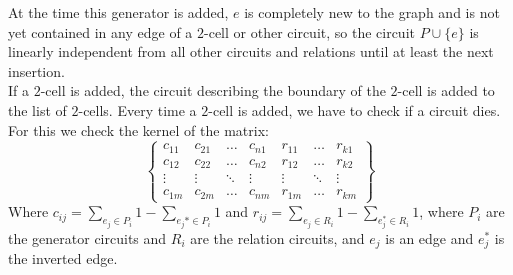 \documentclass[11pt, a4paper, UKenglish]{article}
\begin{document}
    At the time this generator is added, $e$ is completely new to the graph and is not yet contained in any edge of a $2$-cell or other circuit, so the circuit $P\cup\{e\}$ is linearly independent from all other circuits and relations until at least the next insertion.\\
    If a $2$-cell is added, the circuit describing the boundary of the $2$-cell is added to the list of $2$-cells.
    Every time a $2$-cell is added, we have to check if a circuit dies.
    For this we check the kernel of the matrix:
    \[\begin{Bmatrix}
          c_{11} & c_{21} & \ldots &c_{n1} & r_{11} & \ldots  & r_{k1}\\
          c_{12} & c_{22} & \ldots &c_{n2} & r_{12} & \ldots  & r_{k2}\\
          \vdots & \vdots & \ddots & \vdots & \vdots & \ddots & \vdots \\
          c_{1m} & c_{2m} & \ldots &c_{nm} & r_{1m} & \ldots  & r_{km}
    \end{Bmatrix}\]
    Where $c_{ij} = \sum_{e_j\in P_i} 1 - \sum_{e_j*\in P_i}1$ and $r_{ij} = \sum_{e_j\in R_i} 1 - \sum_{e_j^*\in R_i}1$, where $P_i$ are the generator circuits and $R_i$ are the relation circuits, and $e_j$ is an edge and $e_j^*$ is the inverted edge.
\end{document}
